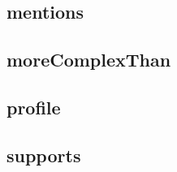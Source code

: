 
\subsection{mentions}




\subsection{moreComplexThan}

\subsection{profile}

\subsection{supports}

